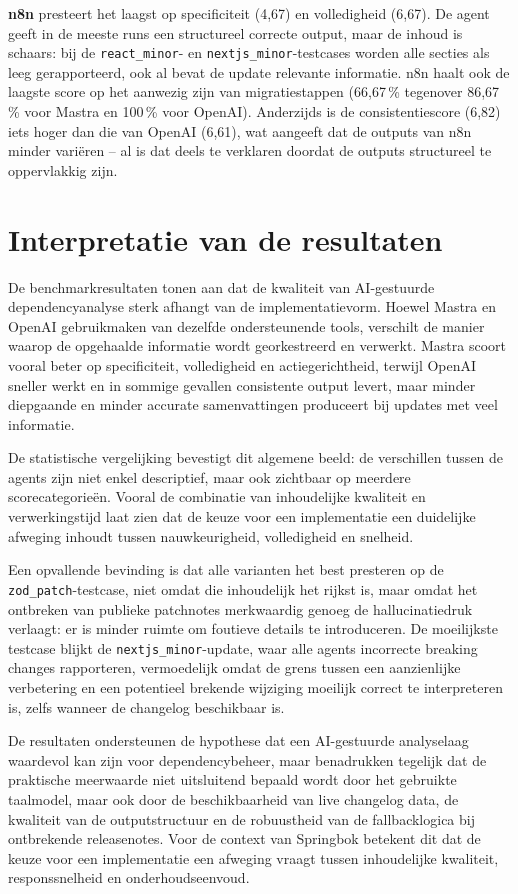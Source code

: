 \textbf{n8n} presteert het laagst op specificiteit (4,67) en volledigheid (6,67). De agent geeft in de meeste runs een structureel correcte output, maar de inhoud is schaars: bij de \texttt{react\_minor}- en \texttt{nextjs\_minor}-testcases worden alle secties als leeg gerapporteerd, ook al bevat de update relevante informatie. n8n haalt ook de laagste score op het aanwezig zijn van migratiestappen (66,67\,\% tegenover 86,67\,\% voor Mastra en 100\,\% voor OpenAI). Anderzijds is de consistentiescore (6,82) iets hoger dan die van OpenAI (6,61), wat aangeeft dat de outputs van n8n minder variëren -- al is dat deels te verklaren doordat de outputs structureel te oppervlakkig zijn.

\section{Interpretatie van de resultaten}
\label{sec:interpretatie-resultaten}

De benchmarkresultaten tonen aan dat de kwaliteit van AI-gestuurde dependencyanalyse sterk afhangt van de implementatievorm. Hoewel Mastra en OpenAI gebruikmaken van dezelfde ondersteunende tools, verschilt de manier waarop de opgehaalde informatie wordt georkestreerd en verwerkt. Mastra scoort vooral beter op specificiteit, volledigheid en actiegerichtheid, terwijl OpenAI sneller werkt en in sommige gevallen consistente output levert, maar minder diepgaande en minder accurate samenvattingen produceert bij updates met veel informatie.

De statistische vergelijking bevestigt dit algemene beeld: de verschillen tussen de agents zijn niet enkel descriptief, maar ook zichtbaar op meerdere scorecategorieën. Vooral de combinatie van inhoudelijke kwaliteit en verwerkingstijd laat zien dat de keuze voor een implementatie een duidelijke afweging inhoudt tussen nauwkeurigheid, volledigheid en snelheid.

Een opvallende bevinding is dat alle varianten het best presteren op de \texttt{zod\_patch}-testcase, niet omdat die inhoudelijk het rijkst is, maar omdat het ontbreken van publieke patchnotes merkwaardig genoeg de hallucinatiedruk verlaagt: er is minder ruimte om foutieve details te introduceren. De moeilijkste testcase blijkt de \texttt{nextjs\_minor}-update, waar alle agents incorrecte breaking changes rapporteren, vermoedelijk omdat de grens tussen een aanzienlijke verbetering en een potentieel brekende wijziging moeilijk correct te interpreteren is, zelfs wanneer de changelog beschikbaar is.

De resultaten ondersteunen de hypothese dat een AI-gestuurde analyselaag waardevol kan zijn voor dependencybeheer, maar benadrukken tegelijk dat de praktische meerwaarde niet uitsluitend bepaald wordt door het gebruikte taalmodel, maar ook door de beschikbaarheid van live changelog data, de kwaliteit van de outputstructuur en de robuustheid van de fallbacklogica bij ontbrekende releasenotes. Voor de context van Springbok betekent dit dat de keuze voor een implementatie een afweging vraagt tussen inhoudelijke kwaliteit, responssnelheid en onderhoudseenvoud.